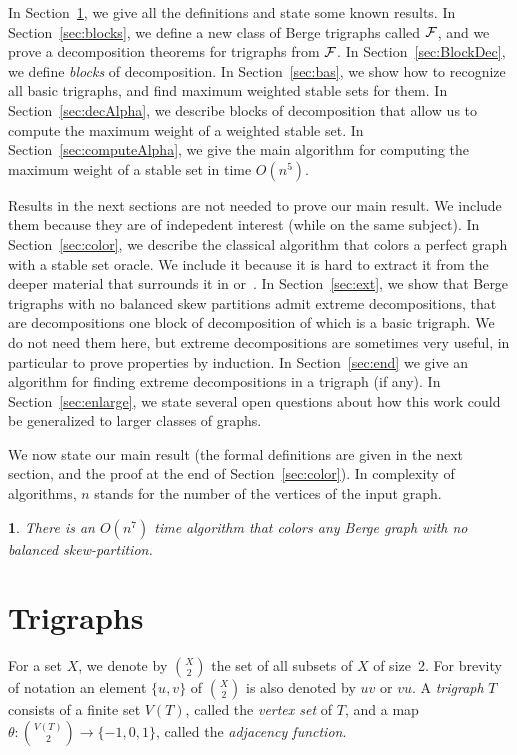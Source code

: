 \documentclass[11 pt] {article}
\newtheorem{theorem}{}[section]
\begin{document}
In Section~\ref{sec:def}, we give all the definitions and state some
known results. In Section~\ref{sec:blocks}, we define a new class of
Berge trigraphs called $\cal F$, and we prove a decomposition theorems
for trigraphs from $\cal F$.  In Section~\ref{sec:BlockDec}, we define
\emph{blocks} of decomposition. In Section~\ref{sec:bas}, we
show how to recognize all basic trigraphs, and find maximum weighted
stable sets for them. In
Section~\ref{sec:decAlpha}, we describe blocks of decomposition that
allow us to compute the maximum weight of a weighted stable set.  In
Section~\ref{sec:computeAlpha}, we give the main algorithm for
computing the maximum weight of a stable set in time $O(n^5)$.  

Results in the next sections are not needed to prove our main result.
We include them because they are of indepedent interest (while on the
same subject).  In Section~\ref{sec:color}, we describe the classical
algorithm that colors a perfect graph with a stable set oracle.  We
include it because it is hard to extract it from the deeper material that
surrounds it in \cite{gls:color} or~\cite{KrSe:colorP}.  In
Section~\ref{sec:ext}, we show that Berge trigraphs with no
balanced skew partitions admit extreme decompositions, that are
decompositions one block of decomposition of which is a basic
trigraph.  We do not need them here, but extreme decompositions are
sometimes very useful, in particular to prove properties by induction.
In Section~\ref{sec:end} we give an algorithm for finding extreme decompositions in a
trigraph (if any).  In Section~\ref{sec:enlarge}, we state several
open questions about how this work could be generalized to larger
classes of graphs.

We now state our main result (the formal definitions are given in the
next section, and the proof at the end of Section~\ref{sec:color}). In
complexity of algorithms, $n$ stands for the number of the vertices of
the input graph.

\begin{theorem}
  \label{th:colorM}
  There is an $O(n^7)$ time algorithm that colors any Berge graph with
  no balanced skew-partition.
\end{theorem}




\section{Trigraphs}
\label{sec:def}

For a set $X$, we denote by $X \choose 2$ the set of all subsets of
$X$ of size~2. For brevity of notation an element $\{ u,v \}$ of $X
\choose 2$ is also denoted by $uv$ or $vu$. A {\em trigraph} $T$
consists of a finite set $V(T)$, called the {\em vertex set} of $T$,
and a map $\theta : {{V(T)} \choose 2} \longrightarrow \{ -1,0,1 \}$,
called the {\em adjacency function}.
\end{document}
